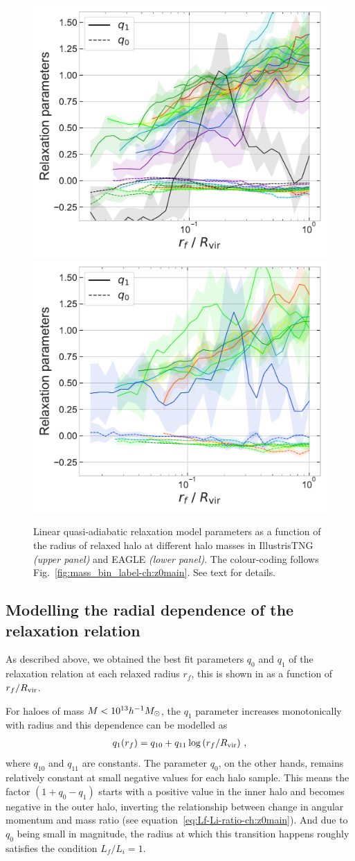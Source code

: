 \begin{figure}
    \centering
    \includegraphics[width=0.49\linewidth]{plots/fit_params_rf_M_T.pdf}
    \includegraphics[width=0.49\linewidth]{plots/fit_params_rf_M_E.pdf}
    \caption{Linear quasi-adiabatic relaxation model parameters as a function of the radius of relaxed halo at different halo masses in IllustrisTNG \emph{(upper panel)} and EAGLE \emph{(lower panel)}. The colour-coding follows Fig.~\ref{fig:mass_bin_label-ch:z0main}. See text for details.}
    \label{fig:rf-fit-params-ch:z0main}
\end{figure}


\subsection{Modelling the radial dependence of the relaxation relation}
As described above, we obtained the best fit parameters $q_0$ and $q_1$ of the relaxation relation at each relaxed radius $r_f$, this is shown in  as a function of $r_f/R_{\rm vir}$. 

For haloes of mass $M<10^{13}h^{-1}M_{\odot}$, the $q_1$ parameter increases monotonically with radius and this dependence can be modelled as 
\begin{align}
q_1 (r_f) = q_{10} + q_{11} \log \left( r_f/R_{\rm vir} \right) \,,
\label{eq:q1(r_f)-ch:z0main}
\end{align}
where $q_{10}$ and $q_{11}$ are constants.
The parameter $q_0$, on the other hands, remains relatively constant at small negative values for each halo sample.
This means the factor $(1 + q_0 - q_1)$ starts with a positive value in the inner halo and becomes negative in the outer halo, inverting the relationship between change in angular momentum and mass ratio (see equation~\ref{eq:Lf-Li-ratio-ch:z0main}). And due to $q_0$ being small in magnitude, the radius at which this transition happens roughly satisfies the condition $L_f/L_i=1$. 

